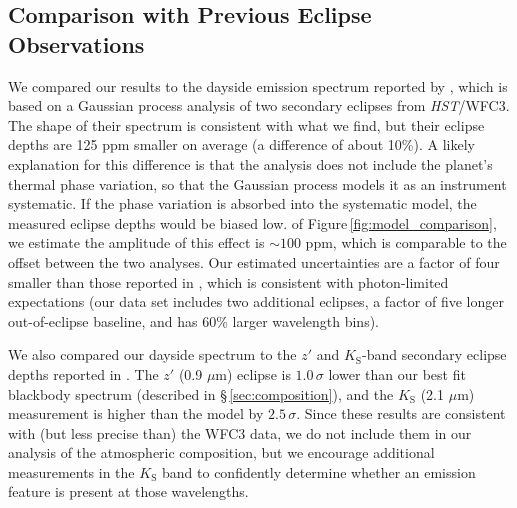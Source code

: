 \documentclass[twocolumn, trackchanges]{aastex61}
\newcommand{\project}[1]{\textsl{#1}}
\newcommand{\HST}{\project{HST}}
\begin{document}
\subsection{Comparison with Previous Eclipse Observations}
We compared our results to the dayside emission spectrum reported by \cite{cartier17}, which is based on a Gaussian process analysis of two secondary eclipses from \HST/WFC3. The shape of their spectrum is consistent with what we find, but their eclipse depths are 125 ppm smaller on average (a difference of about 10\%). A likely explanation for this difference is that the \cite{cartier17} analysis does not include the planet's thermal phase variation, so that the Gaussian process models it as an instrument systematic.  If the phase variation is absorbed into the systematic model, the measured eclipse depths would be biased low.   of Figure\,\ref{fig:model_comparison}, we estimate the amplitude of this effect is $\sim100$ ppm, which is comparable to the offset between the two analyses. Our estimated uncertainties are a factor of four smaller than those reported in \cite{cartier17}, which is consistent with photon-limited expectations (our data set includes two additional eclipses, a factor of five longer out-of-eclipse baseline, and has 60\% larger wavelength bins).


We also compared our dayside spectrum to the $z'$ and $K_\mathrm{S}$-band secondary eclipse depths reported in \cite{delrez18}. The $z'$ (0.9 $\mu$m) eclipse is $1.0\,\sigma$ lower than our best fit blackbody spectrum (described in \S\,\ref{sec:composition}), and the $K_\mathrm{S}$ (2.1 $\mu$m) measurement is higher than the model by $2.5\,\sigma$. Since these results are consistent with (but less precise than) the WFC3 data, we do not include them in our analysis of the atmospheric composition, but we encourage additional measurements in the $K_\mathrm{S}$ band to confidently determine whether an emission feature is present at those wavelengths.
\end{document}

